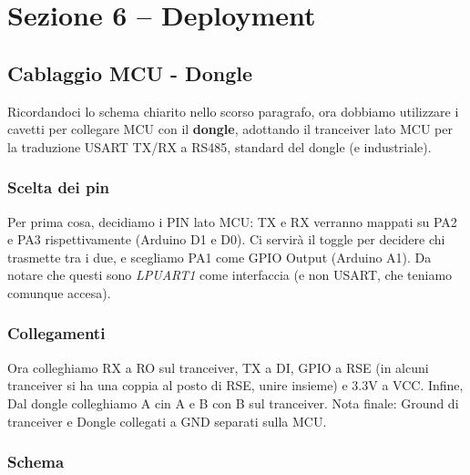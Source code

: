 \section{Sezione 6 -- Deployment}

\subsection{Cablaggio MCU - Dongle}

Ricordandoci lo schema chiarito nello scorso paragrafo, ora dobbiamo utilizzare i cavetti per collegare MCU con il \textbf{dongle}, adottando il tranceiver lato MCU per la traduzione USART TX/RX a RS485, standard del dongle (e industriale). 
\subsubsection{Scelta dei pin}
Per prima cosa, decidiamo i PIN lato MCU: TX e RX verranno mappati su PA2 e PA3 rispettivamente (Arduino D1 e D0). Ci servirà il toggle per decidere chi trasmette tra i due, e scegliamo PA1 come GPIO Output (Arduino A1). Da notare che questi sono \textit{LPUART1} come interfaccia (e non USART, che teniamo comunque accesa).
\subsubsection{Collegamenti}
Ora colleghiamo RX a RO sul tranceiver, TX a DI, GPIO a RSE (in alcuni tranceiver si ha una coppia al posto di RSE, unire insieme) e 3.3V a VCC. 
Infine, Dal dongle colleghiamo A cin A e B con B sul tranceiver. Nota finale: Ground di tranceiver e Dongle collegati a GND separati sulla MCU. 
\subsubsection{Schema}

\begin{figure}[h]
\centering
{}
\end{figure}


